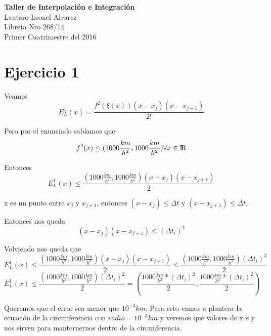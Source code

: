 \documentclass[a4paper,10pt]{article}
\begin{document}
\begin{addmargin}[8cm]{0cm}
	\textbf{Taller de Interpolación e Integración} \\
	Lautaro Leonel Alvarez \\
	Libreta Nro 268/14 \\
	Primer Cuatrimestre del 2016 \\
\end{addmargin}



\section{Ejercicio 1}
\par Veamos
\begin{equation}
	E_L^1(x) =  \frac{f^2(\xi(x))(x - x_j)(x - x_{j+1})}{2!}
\end{equation}
\par Pero por el enunciado sabíamos que
\begin{equation}
	f^2(x) \leq (1000 \frac{km}{h^2}, 1000 \frac{km}{h^2}) \forall x \in {\rm I\!R}
\end{equation}
\par Entonces
\begin{equation}
	E_L^1(x) \leq \frac{(1000 \frac{km}{h^2}, 1000 \frac{km}{h^2})(x - x_j)(x - x_{j+1})}{2}
\end{equation}
\par x es un punto entre $x_j$ y $x_{j+1}$, entonces $(x - x_j) \le \Delta t$ y $(x - x_{j+1}) \le \Delta t$.
\par Entonces nos queda
\begin{equation}
	(x - x_j)(x - x_{j+1}) \leq (\Delta t_i)^2
\end{equation}
\par Volviendo nos queda que
\begin{equation}
	E_L^1(x) \leq \frac{(1000 \frac{km}{h^2}, 1000 \frac{km}{h^2})(x - x_j)(x - x_{j+1})}{2} \leq \frac{(1000 \frac{km}{h^2}, 1000 \frac{km}{h^2})(\Delta t_i)^2}{2}
\end{equation}
\begin{equation}
	E_L^1(x) \leq \frac{(1000 \frac{km}{h^2}, 1000 \frac{km}{h^2})(\Delta t_i)^2}{2}  = (\frac{1000 \frac{km}{h^2} * (\Delta t_i)^2}{2}, \frac{1000 \frac{km}{h^2} * (\Delta t_i)^2}{2})
\end{equation}
\par Queremos que el error sea menor que $10^{-3}km$. Para esto vamos a plantear la ecuación de la circunferencia con $radio = 10^{-3}km$ y veremos que valores de x e y nos sirven para manternernos dentro de la circunferencia.
\end{document}

